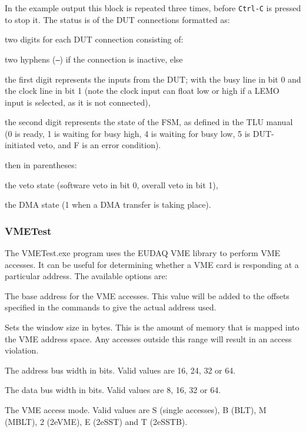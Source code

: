 In the example output this block is repeated three times, before \texttt{Ctrl-C} is pressed to stop it.
The status is of the \gls{DUT} connections formatted as:
\begin{myitemize}
\item two digits for each \gls{DUT} connection consisting of:
  \begin{myitemize}
  \item two hyphens (\texttt{--}) if the connection is inactive, else
  \item the first digit represents the inputs from the \gls{DUT}; with the busy line in bit 0 and the clock line in bit 1
  (note the clock input can float low or high if a LEMO input is selected, as it is not connected),
  \item the second digit represents the state of the FSM, as defined in the \gls{TLU} manual\cite{Cussans2009}
  (0 is ready, 1 is waiting for busy high, 4 is waiting for busy low, 5 is \gls{DUT}-initiated veto, and F is an error condition).
  \end{myitemize}
\item then in parentheses:
  \begin{myitemize}
  \item the veto state (software veto in bit 0, overall veto in bit 1),
  \item the DMA state (1 when a DMA transfer is taking place).
  \end{myitemize}
\end{myitemize}

\subsubsection{VMETest}
The VMETest.exe program uses the EUDAQ VME library to perform VME accesses.
It can be useful for determining whether a VME card is responding at a particular address.
The available options are:
\begin{description}
The base address for the VME accesses.
This value will be added to the offsets specified in the commands to give the actual address used.

Sets the window size in bytes.
This is the amount of memory that is mapped into the VME address space.
Any accesses outside this range will result in an access violation.

The address bus width in bits.
Valid values are 16, 24, 32 or 64.

The data bus width in bits.
Valid values are 8, 16, 32 or 64.

The VME access mode.
Valid values are S (single accesses), B (BLT), M (MBLT), 2 (2eVME), E (2eSST) and T (2eSSTB).

\end{description}

